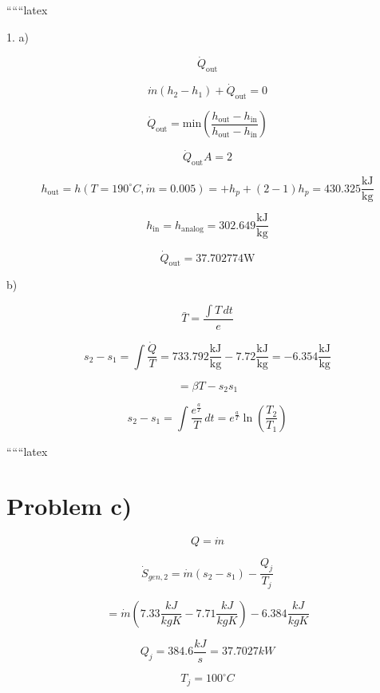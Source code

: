 
``````latex


1. a)

\[
\dot{Q}_{\text{out}}
\]

\[
\dot{m}(h_2 - h_1) + \dot{Q}_{\text{out}} = 0
\]

\[
\dot{Q}_{\text{out}} = \text{min} \left( \frac{h_{\text{out}} - h_{\text{in}}}{h_{\text{out}} - h_{\text{in}}} \right)
\]

\[
\dot{Q}_{\text{out}} A = 2
\]

\[
h_{\text{out}} = h(T = 190^\circ C, \dot{m} = 0.005) = + h_p + (2-1) h_p = 430.325 \frac{\text{kJ}}{\text{kg}}
\]

\[
h_{\text{in}} = h_{\text{analog}} = 302.649 \frac{\text{kJ}}{\text{kg}}
\]

\[
\dot{Q}_{\text{out}} = 37.702774 \text{W}
\]

b)

\[
\bar{T} = \frac{\int T \, dt}{e}
\]

\[
s_2 - s_1 = \int \frac{\dot{Q}}{T} = 733.792 \frac{\text{kJ}}{\text{kg}} - 7.72 \frac{\text{kJ}}{\text{kg}} = -6.354 \frac{\text{kJ}}{\text{kg}}
\]

\[
= \beta T - s_2 s_1
\]

\[
s_2 - s_1 = \int \frac{e^{\frac{a}{T}}}{T} \, dt = e^{\frac{a}{T}} \ln \left( \frac{T_2}{T_1} \right)
\]

``````latex


\section*{Problem c)}

\begin{equation*}
Q = \dot{m}
\end{equation*}

\begin{equation*}
\dot{S}_{gen,2} = \dot{m} (s_{2} - s_{1}) - \frac{Q_{j}}{T_{j}}
\end{equation*}

\begin{equation*}
= \dot{m} (7.33 \frac{kJ}{kgK} - 7.71 \frac{kJ}{kgK}) - 6.384 \frac{kJ}{kgK}
\end{equation*}

\begin{equation*}
Q_{j} = 384.6 \frac{kJ}{s} = 37.7027 kW
\end{equation*}

\begin{equation*}
T_{j} = 100^\circ C
\end{equation*}

